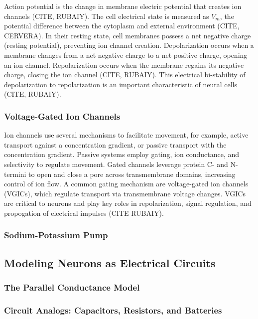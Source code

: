 \documentclass{article} %
\begin{document}
\begin{multicols}{2}
Action potential is the change in membrane electric potential that creates ion channels (CITE, RUBAIY). The cell electrical state is measured as $V_{m}$, the potential difference between the cytoplasm and external environment (CITE, CERVERA). In their resting state, cell membranes possess a net negative charge (resting potential), preventing ion channel creation. Depolarization occurs when a membrane changes from a net negative charge to a net positive charge, opening an ion channel. Repolarization occurs when the membrane regains its negative charge, closing the ion channel (CITE, RUBAIY). This electrical bi-stability of depolarization to repolarization is an important characteristic of neural cells (CITE, RUBAIY).

\subsubsection{Voltage-Gated Ion Channels}
\label{subsubsec:vgic}

Ion channels use several mechanisms to facilitate movement, for example, active transport against a concentration gradient, or passive transport with the concentration gradient. Passive systems employ gating, ion conductance, and selectivity to regulate movement. Gated channels leverage protein C- and N-termini to open and close a pore across transmembrane domains, increasing control of ion flow. A common gating mechanism are voltage-gated ion channels (VGICs), which regulate transport via transmembrane voltage changes. VGICs are critical to neurons and play key roles in repolarization, signal regulation, and propogation of electrical impulses (CITE RUBAIY). 

\subsubsection{Sodium-Potassium Pump}
\label{subsubsec:na_k_pump}



\subsection{Modeling Neurons as Electrical Circuits}
\label{subsec:circuit_model}
\subsubsection{The Parallel Conductance Model}
\label{subsubsec:parallel_conductance}
\subsubsection{Circuit Analogs: Capacitors, Resistors, and Batteries}
\label{subsubsec:circuit_analogs}


\end{multicols}
\end{document}
